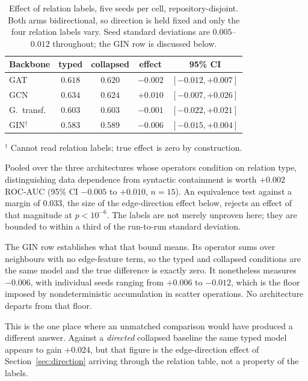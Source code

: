 \begin{table}[h]
\centering
\caption{Effect of relation labels, five seeds per cell, repository-disjoint.
Both arms bidirectional, so direction is held fixed and only the four relation
labels vary. Seed standard deviations are $0.005$--$0.012$ throughout; the GIN
row is discussed below.}
\label{tab:typed}
\small
\begin{tabular}{lcccc}
\toprule
\textbf{Backbone} & \textbf{typed} & \textbf{collapsed} & \textbf{effect} & \textbf{95\% CI} \\
\midrule
GAT         & $0.618$ & $0.620$ & $-0.002$ & $[-0.012,+0.007]$ \\
GCN         & $0.634$ & $0.624$ & $+0.010$ & $[-0.007,+0.026]$ \\
G.\ transf. & $0.603$ & $0.603$ & $-0.001$ & $[-0.022,+0.021]$ \\
\midrule
GIN$^\dagger$ & $0.583$ & $0.589$ & $-0.006$ & $[-0.015,+0.004]$ \\
\bottomrule
\end{tabular}
\begin{tablenotes}\footnotesize
\item $^\dagger$ Cannot read relation labels; true effect is zero by
construction.
\end{tablenotes}
\end{table}

\noindent Pooled over the three architectures whose operators condition on
relation type, distinguishing data dependence from syntactic containment is
worth $+0.002$ ROC-AUC (95\% CI $-0.005$ to $+0.010$, $n=15$). An equivalence
test against a margin of $0.033$, the size of the edge-direction effect below,
rejects an effect of that magnitude at $p<10^{-6}$. The labels are not merely
unproven here; they are bounded to within a third of the run-to-run standard
deviation.

The GIN row establishes what that bound means. Its operator sums over
neighbours with no edge-feature term, so the typed and collapsed conditions are
the same model and the true difference is exactly zero. It nonetheless measures
$-0.006$, with individual seeds ranging from $+0.006$ to $-0.012$, which is the
floor imposed by nondeterministic accumulation in scatter operations. No
architecture departs from that floor.

This is the one place where an unmatched comparison would have produced a
different answer. Against a \emph{directed} collapsed baseline the same typed
model appears to gain $+0.024$, but that figure is the edge-direction effect of
Section~\ref{sec:direction} arriving through the relation table, not a property
of the labels.

